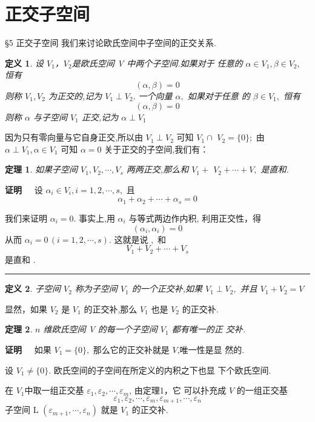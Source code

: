 \documentclass[13pt]{beamer}
\newtheorem{thm}{定理}
\newtheorem*{defi}{定义}
\def\qed{\nopagebreak\hfill{\rule{4pt}{7pt}}\medbreak}
\def\pf{{\bf 证明~~ }}
\begin{document}
\section{正交子空间}
\begin{frame}{\S 5 正交子空间}
我们来讨论欧氏空间中子空间的正交关系. 
\begin{defi}
设 $V_1$，$V_2$是欧氏空间 V 中两个子空间.如果对于 任意的 ${\alpha} \in V_{1}, {\beta} \in V_{2},$ 恒有
\[
({\alpha}, {\beta})= {0}
\]
则称 $V_{1}, V_{2}$ 为正交的,记为 $V_{1} \perp V_{2} .$ 一个向量 ${\alpha},$ 如果对于任意 的 ${\beta} \in V_{1},$ 恒有
\[
({\alpha}, {\beta})=0
\]
则称 ${\alpha}$ 与子空间 $V_{1}$ \alert{正交},记为 ${\alpha} \perp V_{1}$
\end{defi}
\end{frame}


\begin{frame}
因为只有零向量与它自身正交,所以由 $V_{1} \perp V_{2}$ 可知 $V_{1} \cap$ $V_{2}=\{{0}\} ;$ 由 ${\alpha} \perp V_{1}, {\alpha} \in V_{1}$ 可知 ${\alpha}={0}$
关于正交的子空间,我们有： 
\begin{thm}
	如果子空间 $V_{1}, V_{2}, \cdots, V_{s}$ 两两正交,那么和 $V_{1}+$ $V_{2}+\cdots+V,$ 是直和. 
\end{thm}
\pf 设 ${\alpha}_{i} \in V_{i}, i=1,2, \cdots, s,$ 且
\[
{\alpha}_{1}+{\alpha}_{2}+\cdots+{\alpha}_{s}={0}
\]
 
我们来证明 ${\alpha}_{i}={0}$.  事实上,用 ${\alpha}_{i}$ 与等式两边作内积, 利用正交性，得
\[
\left({\alpha}_{i}, {\alpha}_{i}\right)=0
\]
从而 ${\alpha}_{i}={0}\, (i=1,2, \cdots, s) .$ 这就是说 $,$ 和
\[
V_{1}+V_{2}+\cdots+V_{s}
\]
是直和 . \qed
\end{frame}


\begin{frame}
\begin{defi}
子空间 $V_{2}$ 称为子空间 $V_{1}$ 的一个正交补,如果 $V_{1} \perp V_{2},$ 并且 $V_{1}+V_{2}=V$
\end{defi}
显然，如果 $V_{2}$ 是 $V_{1}$ 的正交补,那么 $V_{1}$ 也是 $V_{2}$ 的正交补.
\end{frame}


\begin{frame}
\begin{thm}
$n$ 维欧氏空间 V 的每一个子空间 $V_{1}$ 都有唯一的正 交补. 
\end{thm}
\pf 如果 $V_{1}=\{{0}\},$ 那么它的正交补就是 $V$,唯一性是显
然的.

设 $V_{1} \neq\{{0}\} .$ 欧氏空间的子空间在所定义的内积之下也显
下个欧氏空间.

在 $V_1$中取一组正交基 ${\varepsilon}_{1}, {\varepsilon}_{2}, \cdots, {\varepsilon}_{m}$, 由定理1，它
可以扑充成 $V$ 的一组正交基
\[
{\varepsilon}_{1}, {\varepsilon}_{2}, \cdots, {\varepsilon}_{m}, {\varepsilon}_{m+1}, \cdots, {\varepsilon}_{n}
\]
子空间 L $\left({\varepsilon}_{m+1}, \cdots, {\varepsilon}_{n}\right)$ 就是 $V_{1}$ 的正交补.
\end{frame}
\end{document}
